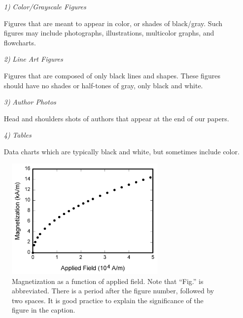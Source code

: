 \documentclass[journal]{IEEEtai}
\begin{document}
\begin{enumerate}
\item[{\it 1)}]{\it Color/Grayscale Figures}

Figures that are meant to appear in color, or shades of black/gray. Such figures may include photographs, illustrations, multicolor graphs, and flowcharts.

\item[{\it 2)}]{\it Line Art Figures}

Figures that are composed of only black lines and shapes. These figures should have no shades or half-tones of gray, only black and white.

\item[{\it 3)}]{\it Author Photos}

Head and shoulders shots of authors that appear at the end of our papers.

\item[{\it 4)}]{\it Tables}

Data charts which are typically black and white, but sometimes include color.
\end{enumerate}
\begin{figure}
\centerline{\includegraphics[width=18.5pc]{fig1.png}}
\caption{Magnetization as a function of applied field. Note that ``Fig.'' is abbreviated. There is a period after the figure number, followed by two spaces. It is good practice to explain the significance of the figure in the caption.}
\end{figure}
\end{document}

